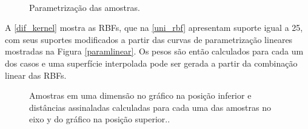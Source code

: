 \begin{figure}[H] 
    \centering
    \caption{Parametrização das amostras.} \label{param}
      \\
\end{figure}

A \autoref{dif_kernel} mostra as RBFs, que na \autoref{uni_rbf} apresentam suporte igual a 25, com seus suportes modificados a partir das curvas de parametrização lineares mostradas na Figura \autoref{paramlinear}. Os pesos são então calculados para cada um dos casos e uma superfície interpolada pode ser gerada a partir da combinação linear das RBFs.

\begin{figure}[H] 
    \centering
    \caption{Amostras em uma dimensão no gráfico na posição inferior e distâncias assinaladas calculadas para cada uma das amostras no eixo y do gráfico na posição superior..} \label{dif_kernel}
     \hspace{1em}
\end{figure}

